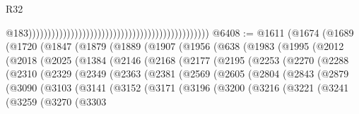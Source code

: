 \begin{lexlean}{R32}
\begin{coremodule}
                                                                                                  @183)))))))))))))))))))))))))))))))))))))))))))))))
@6408 := @1611
    (@1674
      (@1689
        (@1720
          (@1847
            (@1879
              (@1889
                (@1907
                  (@1956
                    (@638
                      (@1983
                        (@1995
                          (@2012
                            (@2018
                              (@2025
                                (@1384
                                  (@2146
                                    (@2168
                                      (@2177
                                        (@2195
                                          (@2253
                                            (@2270
                                              (@2288
                                                (@2310
                                                  (@2329
                                                    (@2349
                                                      (@2363
                                                        (@2381
                                                          (@2569
                                                            (@2605
                                                              (@2804
                                                                (@2843
                                                                  (@2879
                                                                    (@3090
                                                                      (@3103
                                                                        (@3141
                                                                          (@3152
                                                                            (@3171
                                                                              (@3196
                                                                                (@3200
                                                                                  (@3216
                                                                                    (@3221
                                                                                      (@3241
                                                                                        (@3259
                                                                                          (@3270
                                                                                            (@3303

\end{coremodule}
\end{lexlean}
